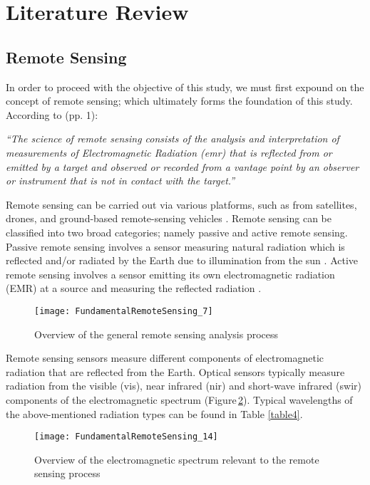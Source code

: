 \section{Literature Review}

\subsection{Remote Sensing}

\justify
In order to proceed with the objective of this study, we must first expound on the concept of remote sensing; which ultimately forms the foundation of this study. According to \citealp{MK2011} (pp. 1):

\justify
\textit{“The science of remote sensing consists of the analysis and interpretation of measurements of Electromagnetic Radiation (\ac{emr}) that is reflected from or emitted by a target and observed or recorded from a vantage point by an observer or instrument that is not in contact with the target.”}

\justify
Remote sensing can be carried out via various platforms, such as from satellites, drones, and ground-based remote-sensing vehicles \citep{lwin2008}. Remote sensing can be classified into two broad categories; namely passive and active remote sensing. Passive remote sensing involves a sensor measuring natural radiation which is reflected and/or radiated by the Earth due to illumination from the sun \citep{lwin2008}. Active remote sensing involves a sensor emitting its own electromagnetic radiation (EMR) at a source and measuring the reflected radiation \citep{lwin2008}. 

\begin{figure}[H]
	\centering
	\texttt{[image: FundamentalRemoteSensing\_7]}
	\caption{Overview of the general remote sensing analysis process \citep{lwin2008}}\label{Fig5}
\end{figure}
\vspace{-12pt}

\justify
Remote sensing sensors measure different components of electromagnetic radiation that are reflected from the Earth. Optical sensors typically measure radiation from the visible (\ac{vis}), near infrared (\ac{nir}) and short-wave infrared (\ac{swir}) components of the electromagnetic spectrum (Figure\,\ref{Fig6}). Typical wavelengths of the above-mentioned radiation types can be found in Table \ref{table4}.

\begin{figure}[H]
	\centering
	\texttt{[image: FundamentalRemoteSensing\_14]}
	\caption{Overview of the electromagnetic spectrum relevant to the remote sensing process \citep{lwin2008}}\label{Fig6}
\end{figure}
\vspace{-12pt}

